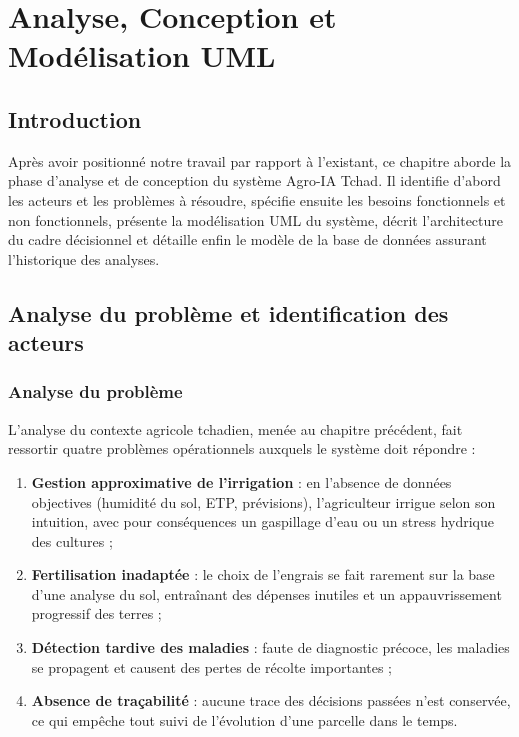 
\chapter{Analyse, Conception et Modélisation UML}
\label{chap:conception}

\section*{Introduction}

Après avoir positionné notre travail par rapport à l'existant, ce
chapitre aborde la phase d'analyse et de conception du système
Agro-IA Tchad. Il identifie d'abord les acteurs et les problèmes à
résoudre, spécifie ensuite les besoins fonctionnels et non
fonctionnels, présente la modélisation UML du système, décrit
l'architecture du cadre décisionnel et détaille enfin le modèle de
la base de données assurant l'historique des analyses.

\section{Analyse du problème et identification des acteurs}
\label{sec:acteurs}

\subsection{Analyse du problème}

L'analyse du contexte agricole tchadien, menée au chapitre
précédent, fait ressortir quatre problèmes opérationnels auxquels
le système doit répondre :

\begin{enumerate}[leftmargin=1.2cm]
	\item \textbf{Gestion approximative de l'irrigation} : en
	l'absence de données objectives (humidité du sol, ETP,
	prévisions), l'agriculteur irrigue selon son intuition,
	avec pour conséquences un gaspillage d'eau ou un stress
	hydrique des cultures ;
	\item \textbf{Fertilisation inadaptée} : le choix de l'engrais
	se fait rarement sur la base d'une analyse du sol,
	entraînant des dépenses inutiles et un appauvrissement
	progressif des terres ;
	\item \textbf{Détection tardive des maladies} : faute de
	diagnostic précoce, les maladies se propagent et causent
	des pertes de récolte importantes ;
	\item \textbf{Absence de traçabilité} : aucune trace des
	décisions passées n'est conservée, ce qui empêche tout
	suivi de l'évolution d'une parcelle dans le temps.
\end{enumerate}

